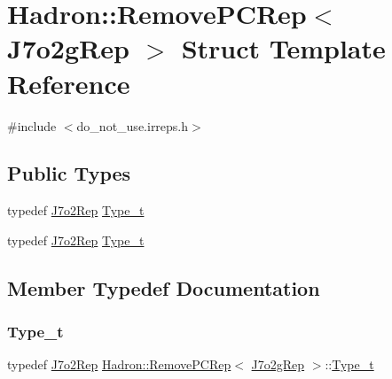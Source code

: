 \hypertarget{structHadron_1_1RemovePCRep_3_01J7o2gRep_01_4}{}\section{Hadron\+:\+:Remove\+P\+C\+Rep$<$ J7o2g\+Rep $>$ Struct Template Reference}
\label{structHadron_1_1RemovePCRep_3_01J7o2gRep_01_4}


{\ttfamily \#include $<$do\+\_\+not\+\_\+use.\+irreps.\+h$>$}

\subsection*{Public Types}
\begin{DoxyCompactItemize}
\item 
typedef \mbox{\hyperlink{structHadron_1_1J7o2Rep}{J7o2\+Rep}} \mbox{\hyperlink{structHadron_1_1RemovePCRep_3_01J7o2gRep_01_4_a588ca5a96069442fc4282729bdc40e7f}{Type\+\_\+t}}
\item 
typedef \mbox{\hyperlink{structHadron_1_1J7o2Rep}{J7o2\+Rep}} \mbox{\hyperlink{structHadron_1_1RemovePCRep_3_01J7o2gRep_01_4_a588ca5a96069442fc4282729bdc40e7f}{Type\+\_\+t}}
\end{DoxyCompactItemize}


\subsection{Member Typedef Documentation}
\mbox{\label{structHadron_1_1RemovePCRep_3_01J7o2gRep_01_4_a588ca5a96069442fc4282729bdc40e7f}} 
\subsubsection{\texorpdfstring{Type\_t}{Type\_t}\hspace{0.1cm}{\footnotesize\ttfamily [1/2]}}
{\footnotesize\ttfamily typedef \mbox{\hyperlink{structHadron_1_1J7o2Rep}{J7o2\+Rep}} \mbox{\hyperlink{structHadron_1_1RemovePCRep}{Hadron\+::\+Remove\+P\+C\+Rep}}$<$ \mbox{\hyperlink{structHadron_1_1J7o2gRep}{J7o2g\+Rep}} $>$\+::\mbox{\hyperlink{structHadron_1_1RemovePCRep_3_01J7o2gRep_01_4_a588ca5a96069442fc4282729bdc40e7f}{Type\+\_\+t}}}


